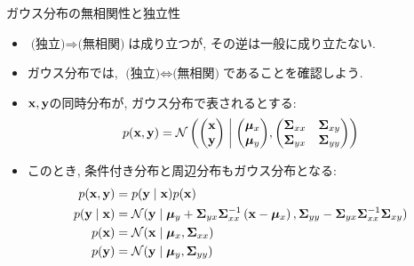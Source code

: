 \documentclass[dvipdfmx,notheorems,t]{beamer}
\begin{document}
\begin{frame}{ガウス分布の無相関性と独立性}
\begin{itemize}
  \item $\text{(独立)} \Longrightarrow \text{(無相関)}$は成り立つが, その逆は一般に成り立たない.
  \item ガウス分布では, $\text{(独立)} \Longleftrightarrow \text{(無相関)}$であることを確認しよう.
  \item $\vb{x}, \vb{y}$の同時分布が, ガウス分布で表されるとする:
  \begin{align*}
    p(\vb{x}, \vb{y}) = \mathcal{N} \left( \mqty(\vb{x} \\ \vb{y}) \middlerel|
      \mqty(\vb*{\mu}_x \\ \vb*{\mu}_y),
      \mqty(\vb{\Sigma}_{xx} & \vb{\Sigma}_{xy} \\
        \vb{\Sigma}_{yx} & \vb{\Sigma}_{yy}) \right)
  \end{align*}
  \item このとき, 条件付き分布と周辺分布もガウス分布となる:
  \begin{align*}
    p(\vb{x}, \vb{y}) &= p(\vb{y} \mid \vb{x}) p(\vb{x}) \\
    p(\vb{y} \mid \vb{x}) &= \mathcal{N}(\vb{y} \mid \vb*{\mu}_y
      + \vb{\Sigma}_{yx} \vb{\Sigma}_{xx}^{-1} \left( \vb{x} - \vb*{\mu}_x \right),
      \vb{\Sigma}_{yy} - \vb{\Sigma}_{yx} \vb{\Sigma}_{xx}^{-1} \vb{\Sigma}_{xy}) \\
    p(\vb{x}) &= \mathcal{N}(\vb{x} \mid \vb*{\mu}_x, \vb{\Sigma}_{xx}) \\
    p(\vb{y}) &= \mathcal{N}(\vb{y} \mid \vb*{\mu}_y, \vb{\Sigma}_{yy})
  \end{align*}
\end{itemize}
\end{frame}
\end{document}
